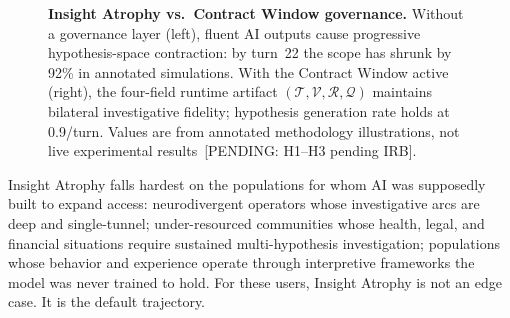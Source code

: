 \documentclass{article}
\newcommand{\cw}{Contract Window\xspace}
\newcommand{\ia}{Insight Atrophy\xspace}
\newcommand{\pending}[1]{\textcolor{pendingred}{[PENDING: #1]}}
\begin{document}
\begin{figure}[t]
\caption{\textbf{Insight Atrophy vs.\ Contract Window governance.}
Without a governance layer (left), fluent AI outputs cause progressive
hypothesis-space contraction: by turn~22 the scope has shrunk by 92\% in
annotated simulations. With the Contract Window active (right), the
four-field runtime artifact $(\mathcal{T},\mathcal{V},\mathcal{R},\mathcal{Q})$
maintains bilateral investigative fidelity; hypothesis generation rate holds
at 0.9/turn. Values are from annotated methodology illustrations, not live
experimental results~\pending{H1--H3 pending IRB}.}
\label{fig:ia-mechanism}
\end{figure}

\ia{} falls hardest on the populations for whom AI was supposedly built to
expand access: neurodivergent operators whose investigative arcs are deep and
single-tunnel; under-resourced communities whose health, legal, and financial
situations require sustained multi-hypothesis investigation; populations whose
behavior and experience operate through interpretive frameworks the model was
never trained to hold. For these users, \ia{} is not an edge case. It is the
default trajectory.
\end{document}

